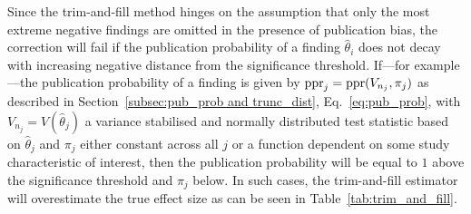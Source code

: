 Since the trim-and-fill method hinges on the assumption that only the most extreme negative findings are omitted in the presence of publication bias, the correction will fail if the publication probability of a finding $\hat{\theta}_i$ does not decay with increasing negative distance from the significance threshold. If---for example---the publication probability of a finding is given by ${\operatorname{\text{ppr}}_j = \operatorname{\text{ppr}}(V_{n_j}, \pi_j)}$ as described in Section~\ref{subsec:pub_prob and trunc_dist}, Eq.~\ref{eq:pub_prob}, with ${V_{n_j} = V(\hat{\theta}_j)}$ a variance stabilised and normally distributed test statistic based on $\hat{\theta}_j$ and $\pi_j$ either constant across all $j$ or a function dependent on some study characteristic of interest, then the publication probability will be equal to $1$ above the significance threshold and $\pi_j$ below. In such cases, the trim-and-fill estimator will overestimate the true effect size as can be seen in Table~\ref{tab:trim_and_fill}.\par
